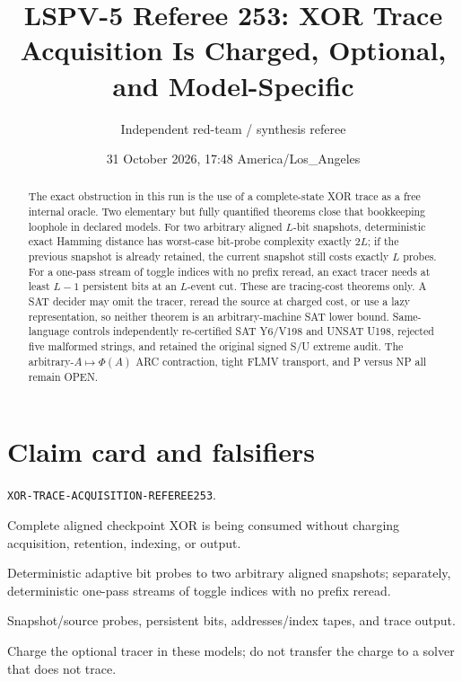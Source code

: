 \documentclass[11pt]{article}
\title{LSPV-5 Referee 253: XOR Trace Acquisition Is Charged, Optional, and Model-Specific}
\author{Independent red-team / synthesis referee}
\date{31 October 2026, 17:48 America/Los\_Angeles}
\newcommand{\status}[1]{\textsf{#1}}
\begin{document}
\maketitle

\begin{abstract}
The exact obstruction in this run is the use of a complete-state XOR trace as a free internal oracle.  Two elementary but fully quantified theorems close that bookkeeping loophole in declared models.  For two arbitrary aligned $L$-bit snapshots, deterministic exact Hamming distance has worst-case bit-probe complexity exactly $2L$; if the previous snapshot is already retained, the current snapshot still costs exactly $L$ probes.  For a one-pass stream of toggle indices with no prefix reread, an exact tracer needs at least $L-1$ persistent bits at an $L$-event cut.  These are tracing-cost theorems only.  A SAT decider may omit the tracer, reread the source at charged cost, or use a lazy representation, so neither theorem is an arbitrary-machine SAT lower bound.  Same-language controls independently re-certified SAT Y6/V198 and UNSAT U198, rejected five malformed strings, and retained the original signed S/U extreme audit.  The arbitrary-$A\mapsto\Phi(A)$ ARC contraction, tight FLMV transport, and P versus NP all remain \status{OPEN}.
\end{abstract}

\section{Claim card and falsifiers}
\begin{description}[leftmargin=2.9cm]
\item[Claim ID.] \texttt{XOR-TRACE-ACQUISITION-REFEREE253}.
\item[Exact obstruction.] Complete aligned checkpoint XOR is being consumed without charging acquisition, retention, indexing, or output.
\item[Model.] Deterministic adaptive bit probes to two arbitrary aligned snapshots; separately, deterministic one-pass streams of toggle indices with no prefix reread.
\item[Resource.] Snapshot/source probes, persistent bits, addresses/index tapes, and trace output.
\item[Weakest useful theorem.] Charge the optional tracer in these models; do not transfer the charge to a solver that does not trace.
\end{description}
\end{document}
